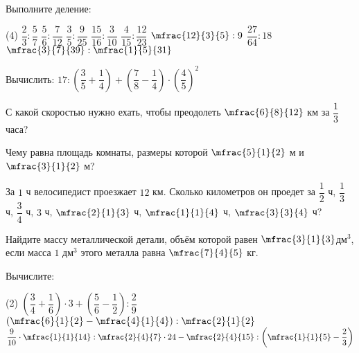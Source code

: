 \begin{class}[number=4]
	\begin{listofex}
		\item Выполните деление:
		\begin{tasks}(4)
			\task \( \dfrac{2}{3}:\dfrac{5}{7} \)
			\task \( \dfrac{5}{6}:\dfrac{7}{12} \)
			\task \( \dfrac{3}{5}:\dfrac{9}{25} \)
			\task \( \dfrac{15}{16}:\dfrac{3}{10} \)
			\task \( \dfrac{4}{15}:\dfrac{12}{23} \)
			\task \( \mfrac{12}{3}{5}:9 \)
			\task \( \dfrac{27}{64}:18 \)
			\task \( \mfrac{3}{7}{39}:\mfrac{1}{5}{31} \)
		\end{tasks}
		\item Вычислить: \( 17:\left( \dfrac{3}{5}+\dfrac{1}{4} \right)+\left( \dfrac{7}{8}-\dfrac{1}{4} \right)\cdot\left( \dfrac{4}{5} \right)^2 \)
		\item С какой скоростью нужно ехать, чтобы преодолеть \( \mfrac{6}{8}{12} \) км за \( \dfrac{1}{3} \) часа?
		\item Чему равна площадь комнаты, размеры которой \( \mfrac{5}{1}{2} \) м и \( \mfrac{3}{1}{2} \) м?
		\item За \( 1 \) ч велосипедист проезжает \( 12 \) км. Сколько километров он проедет за \( \dfrac{1}{2} \) ч, \( \dfrac{1}{3} \) ч, \( \dfrac{3}{4} \) ч, \( 3 \) ч, \( \mfrac{2}{1}{3} \) ч, \( \mfrac{1}{1}{4} \) ч, \( \mfrac{3}{3}{4} \) ч?
		\item Найдите массу металлической детали, объём которой равен \( \mfrac{3}{1}{3} \)дм\( ^3 \), если масса \( 1 \) дм\( ^3\) этого металла равна \( \mfrac{7}{4}{5} \) кг.
		\item Вычислите:
		\begin{tasks}(2)
			\task \( \left( \dfrac{3}{4}+\dfrac{1}{6} \right)\cdot3+\left( \dfrac{5}{6}-\dfrac{1}{2} \right):\dfrac{2}{9} \)
			\task \( \left( \mfrac{6}{1}{2}-\mfrac{4}{1}{4} \right):\mfrac{2}{1}{2} \)
			\task \( \dfrac{9}{10}\cdot\mfrac{1}{1}{14}:\mfrac{2}{4}{7}\cdot24-\mfrac{2}{4}{15}:\left( \mfrac{1}{1}{5}-\dfrac{2}{3} \right) \)
		\end{tasks}
	\end{listofex}
\end{class}

